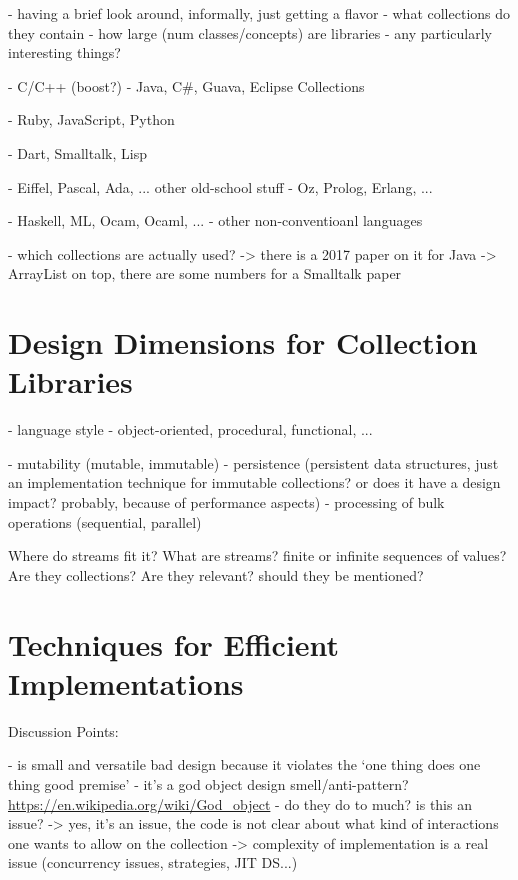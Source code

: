 \documentclass[sigconf, 10pt, review]{acmart}
\begin{document}
\begin{note}
- having a brief look around, informally, just getting a flavor
 - what collections do they contain
 - how large (num classes/concepts) are libraries
 - any particularly interesting things?

- C/C++ (boost?)
- Java, C\#, Guava, Eclipse Collections

- Ruby, JavaScript, Python

- Dart, Smalltalk, Lisp

- Eiffel, Pascal, Ada, ... other old-school stuff
- Oz, Prolog, Erlang, ... 

- Haskell, ML, Ocam, Ocaml, ...
- other non-conventioanl languages

- which collections are actually used?
 -> there is a 2017 paper on it for Java
 -> ArrayList on top, there are some numbers for a Smalltalk paper

\end{note}

\section{Design Dimensions for Collection Libraries}

\begin{note}
  - language style
    - object-oriented, procedural, functional, ...
  
  - mutability (mutable, immutable)
  - persistence (persistent data structures, just an implementation technique for immutable collections? or does it have a design impact? probably, because of performance aspects)
  - processing of bulk operations (sequential, parallel)
  
  
  Where do streams fit it?
  What are streams? finite or infinite sequences of values?
  Are they collections? Are they relevant? should they be mentioned?
\end{note}


\section{Techniques for Efficient Implementations}



Discussion Points:
 

 - is small and versatile bad design because it violates the `one thing does one thing good premise'
   - it's a god object design smell/anti-pattern?
    \url{https://en.wikipedia.org/wiki/God_object}
    - do they do to much? is this an issue?
     -> yes, it's an issue, the code is not clear about what kind of 
        interactions one wants to allow on the collection
     -> complexity of implementation is a real issue (concurrency issues,
        strategies, JIT DS...)
\end{document}

